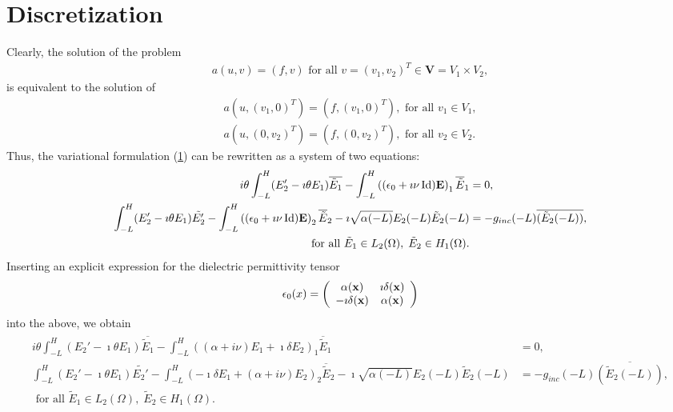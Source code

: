 \documentclass[proc]{edpsmath}
\newcommand{\be}{\begin{equation}}
\newcommand{\ee}{\end{equation}}
\newcommand{\x}{{\bf x}}
\newcommand{\E}{{\bf E}}
\begin{document}
\section{Discretization}
Clearly, the solution of the problem 
\begin{align*}
a(u, v)=(f,v)\text{ for all } v=(v_{1},v_{2})^{T}\in \mathbf{V}=V_1\times V_2, 
\end{align*}
is equivalent to the solution of
\begin{align*}
a(u,(v_{1},0)^{T})=(f,(v_{1},0)^{T}),\text{ for all } v_1\in V_1,\\
a(u,(0,v_{2})^{T})=(f,(0,v_{2})^{T}),\text{ for all } v_2\in V_2.
\end{align*}
Thus, the variational formulation (\ref{}) can be rewritten as a system of two equations:
\begin{align*}
\begin{split}
i\theta \displaystyle \int_{-L}^H (E_2' -\imath\theta E_1)\overline{\tilde E_1} - \int_{-L}^H \left((\epsilon_0 +\imath\nu \operatorname{Id}) \E\right)_{1} \overline{\tilde E}_{1}
&=0,\\
\displaystyle \int_{-L}^H (E_2' -\imath\theta E_1)\tilde {E_2'} - \int_{-L}^H\left( (\epsilon_0 +\imath\nu\operatorname{Id}) \E\right)_{2}\overline{\tilde{E}}_{2}
  - \imath \sqrt{\alpha(-L)} E_2 (-L) \tilde E_2 (-L) &= -g_{inc} (-L) \overline{( \tilde E_2(-L) )},\\
  \text{ for all } \tilde E_{1}\in L_{2}(\Omega), \; \tilde{E}_{2}\in H_{1}(\Omega).
  \end{split}
\end{align*}
Inserting an explicit expression for the dielectric permittivity tensor 
\be \label{eq:epsilonmu}
 \epsilon_0(x) =
\left(
\begin{array}{cc}
\alpha(\x) & \imath \delta (\x)\\
-\imath \delta (\x) & \alpha(\x)
\end{array}
\right)
\ee
into the above, we obtain
\begin{align}
\label{eq:var_form2}
\begin{split}
 i\theta \displaystyle \int_{-L}^H (E_2' -\imath\theta E_1)\overline{\tilde E_1} - 
 \int_{-L}^H \left((\alpha+i\nu)E_1+\imath\delta E_2\right)_{1} \overline{\tilde E}_{1}
&=0,\\
\int_{-L}^H (E_2' -\imath\theta E_1)\tilde {E_2'} -
\int_{-L}^H\left( -\imath \delta E_1+(\alpha+i\nu) E_2\right)_{2}\overline{\tilde{E}}_{2}
  - \imath \sqrt{\alpha(-L)} E_2 (-L) \tilde E_2 (-L) &= -g_{inc} (-L) \overline{( \tilde E_2(-L) )},\\
  \text{ for all } \tilde E_{1}\in L_{2}(\Omega), \; \tilde{E}_{2}\in H_{1}(\Omega).
  \end{split}
\end{align}
\end{document}
